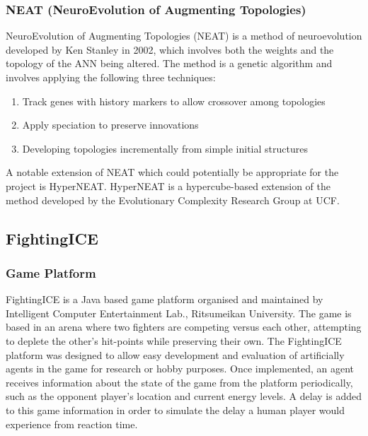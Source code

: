 \documentclass[12pt,a4paper]{article}
\begin{document}
\subsubsection{NEAT (NeuroEvolution of Augmenting Topologies)}
NeuroEvolution of Augmenting Topologies (NEAT) is a method of neuroevolution developed by Ken Stanley in 2002, which involves both the weights and the topology of the ANN being altered. The method is a genetic algorithm and involves applying the following three techniques: \cite{neat}
\begin{enumerate}
\item Track genes with history markers to allow crossover among topologies
\item Apply speciation to preserve innovations
\item Developing topologies incrementally from simple initial structures
\end{enumerate}
A notable extension of NEAT which could potentially be appropriate for the project is HyperNEAT. HyperNEAT is a hypercube-based extension of the method developed by the Evolutionary Complexity Research Group at UCF. \cite{hypehype} \cite{hyperneat}
\newpage
\subsection{FightingICE}
\subsubsection{Game Platform}
FightingICE is a Java based game platform organised and maintained by Intelligent Computer Entertainment Lab., Ritsumeikan University. The game is based in an arena where two fighters are competing versus each other, attempting to deplete the other's hit-points while preserving their own. The FightingICE platform was designed to allow easy development and evaluation of artificially agents in the game for research or hobby purposes. Once implemented, an agent receives information about the state of the game from the platform periodically, such as the opponent player's location and current energy levels. A delay is added to this game information in order to simulate the delay a human player would experience from reaction time. \cite{fightingice}\\
\end{document}
